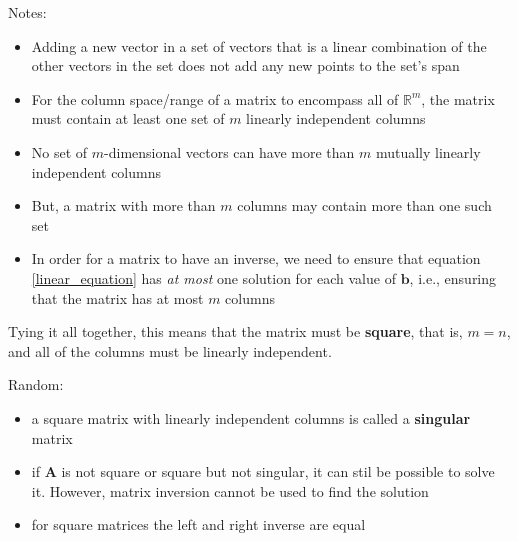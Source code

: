 \documentclass[11pt,twocolumn]{report}
\def\realnumbers{\mathbb{R}}
\begin{document}
Notes:
\begin{itemize}
  \item Adding a new vector in a set of vectors that is a linear combination of
    the other vectors in the set does not add any new points to the set's span
  \item For the column space/range of a matrix to encompass all of
    $\realnumbers^m$, the matrix must contain at least one set of $m$ linearly
    independent columns
  \item No set of $m$-dimensional vectors can have more than $m$ mutually
    linearly independent columns
  \item But, a matrix with more than $m$ columns may contain more than one such
    set
  \item In order for a matrix to have an inverse, we need to ensure that
    equation \ref{linear_equation} has \textit{at most} one solution for each
    value of $\bm{b}$, i.e., ensuring that the matrix has at most $m$ columns
\end{itemize}

Tying it all together, this means that the matrix must be \textbf{square}, that
is, $m=n$, and all of the columns must be linearly independent.

Random:
\begin{itemize}
  \item a square matrix with linearly independent columns is called a
    \textbf{singular} matrix 
  \item if $\bm{A}$ is not square or square but not singular, it can stil be
    possible to solve it.  However, matrix inversion cannot be used to find the
    solution
  \item for square matrices the left and right inverse are equal
\end{itemize}
\end{document}
